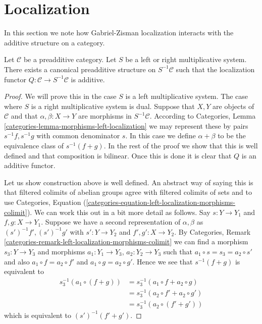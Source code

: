 \section{Localization}
\label{section-localization}

\noindent
In this section we note how Gabriel-Zisman localization interacts with
the additive structure on a category.

\begin{lemma}
\label{lemma-localization-preadditive}
Let $\mathcal{C}$ be a preadditive category.
Let $S$ be a left or right multiplicative system.
There exists a canonical preadditive structure on
$S^{-1}\mathcal{C}$ such that the localization functor
$Q : \mathcal{C} \to S^{-1}\mathcal{C}$ is additive.
\end{lemma}

\begin{proof}
We will prove this in the case $S$ is a left multiplicative system.
The case where $S$ is a right multiplicative system is dual.
Suppose that $X, Y$ are objects of $\mathcal{C}$ and that
$\alpha, \beta : X \to Y$ are morphisms in $S^{-1}\mathcal{C}$. According to
Categories, Lemma \ref{categories-lemma-morphisms-left-localization}
we may represent these by pairs $s^{-1}f, s^{-1}g$ with common denominator
$s$. In this case we define $\alpha + \beta$ to be the equivalence class of
$s^{-1}(f + g)$. In the rest of the proof we show that this is well defined
and that composition is bilinear. Once this is done it is clear that
$Q$ is an additive functor.

\medskip\noindent
Let us show construction above is well defined.
An abstract way of saying this is that filtered colimits of
abelian groups agree with filtered colimits of sets and to use
Categories,
Equation (\ref{categories-equation-left-localization-morphisms-colimit}).
We can work this out in a bit more detail as follows.
Say $s : Y \to Y_1$ and $f, g : X \to Y_1$. Suppose we have a second
representation of $\alpha, \beta$ as $(s')^{-1}f', (s')^{-1}g'$ with
$s' : Y \to Y_2$ and $f', g' : X \to Y_2$. By
Categories, Remark \ref{categories-remark-left-localization-morphisms-colimit}
we can find a morphism $s_3 : Y \to Y_3$ and morphisms
$a_1 : Y_1 \to Y_3$, $a_2 : Y_2 \to Y_3$ such that
$a_1 \circ s = s_3 = a_2 \circ s'$ and also
$a_1 \circ f = a_2 \circ f'$ and $a_1 \circ g = a_2 \circ g'$.
Hence we see that $s^{-1}(f + g)$ is equivalent to
\begin{align*}
s_3^{-1}(a_1 \circ (f + g)) & =
s_3^{-1}(a_1 \circ f + a_2 \circ g) \\
& = s_3^{-1}(a_2 \circ f' + a_2 \circ g') \\
& = s_3^{-1}(a_2 \circ (f' + g'))
\end{align*}
which is equivalent to $(s')^{-1}(f' + g')$.


\end{proof}
